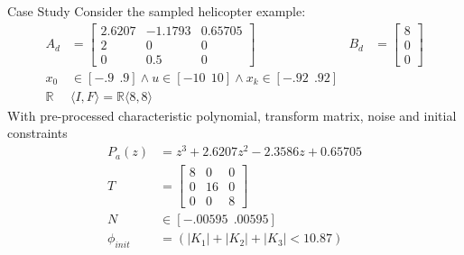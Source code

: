 \documentclass{beamer}
\begin{document}
\begin{frame}{Case Study}
Consider the sampled helicopter example:
\begin{align*}
A_d &= \left[\begin{array}{ccc}2.6207&-1.1793&0.65705\\2&0&0\\0&0.5&0\end{array}\right] &
B_d &= \left [\begin{array}{c}8\\0\\0\end{array}\right]\\
x_0 &\in [-.9\ \ .9] \wedge u \in [-10\ \ 10] \wedge x_k \in [-.92\ \ .92]\\
\mathbb{R}&\langle I,F \rangle=\mathbb{R}\langle 8,8 \rangle
\end{align*}
With pre-processed characteristic polynomial, transform matrix, noise and initial constraints
\begin{align*}
P_a(z) &=z^3 + 2.6207z^2 -2.3586 z + 0.65705\\
T &= \left[\begin{array}{ccc}8&0&0\\0&16&0\\0&0&8\end{array}\right]\\
N &\in [-.00595\ \ .00595]\\
\phi_{init}&=(|K_1|+|K_2|+|K_3|<10.87)
\end{align*}
\end{frame}
\end{document}

